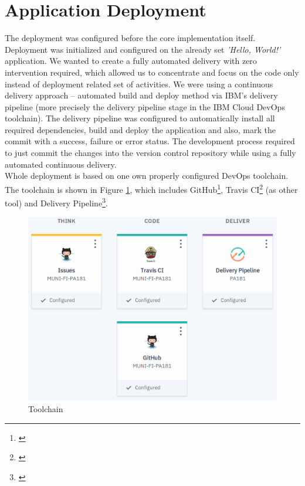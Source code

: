 \documentclass[11pt,a4paper]{article}
\begin{document}
\section{Application Deployment}

The deployment was configured before the core implementation itself. Deployment was initialized and configured on the already set \textit{'Hello, World!'} application. We wanted to create a fully automated delivery with zero intervention required, which allowed us to concentrate and focus on the code only instead of deployment related set of activities. We were using a continuous delivery approach -- automated build and deploy method via IBM's delivery pipeline (more precisely the delivery pipeline stage in the IBM Cloud DevOps toolchain). The delivery pipeline was configured to automatically install all required dependencies, build and deploy the application and also, mark the commit with a success, failure or error status. The development process required to just commit the changes into the version control repository while using a fully automated continuous delivery.\\

Whole deployment is based on one own properly configured DevOps toolchain. The toolchain is shown in Figure \ref{fig:toolchain}, which includes GitHub\footnote{\href{https://console.bluemix.net/docs/services/ContinuousDelivery/toolchains\_integrations.html\#github}{\color{urlColor}{console.bluemix.net/docs/services/ContinuousDelivery/toolchains\_integrations.html\#github}}}, Travis CI\footnote{\href{https://console.bluemix.net/docs/services/ContinuousDelivery/toolchains\_integrations.html\#othertool}{\color{urlColor}{console.bluemix.net/docs/services/ContinuousDelivery/toolchains\_integrations.html\#othertool}}} (as other tool) and Delivery Pipeline\footnote{\href{https://console.bluemix.net/docs/services/ContinuousDelivery/toolchains\_integrations.html\#deliverypipeline}{\color{urlColor}{console.bluemix.net/docs/services/ContinuousDelivery/toolchains\_integrations.html\#deliverypipeline}}}.

\begin{figure}[H]
    \centering
    \includegraphics[scale=0.3]{img/toolchain.png}
    \caption{Toolchain}
    \label{fig:toolchain}
\end{figure}
\end{document}
